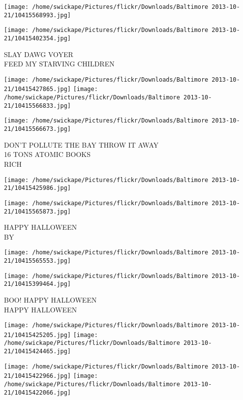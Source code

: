 \documentclass[10pt,letterpaper]{article}
\begin{document}
\texttt{[image: /home/swickape/Pictures/flickr/Downloads/Baltimore 2013-10-21/10415568993.jpg]}

\vspace{0.25in}
\texttt{[image: /home/swickape/Pictures/flickr/Downloads/Baltimore 2013-10-21/10415402354.jpg]}

SLAY DAWG VOYER\\
FEED MY STARVING CHILDREN
\pagebreak

\texttt{[image: /home/swickape/Pictures/flickr/Downloads/Baltimore 2013-10-21/10415427865.jpg]}
\texttt{[image: /home/swickape/Pictures/flickr/Downloads/Baltimore 2013-10-21/10415566833.jpg]}

\vspace{0.25in}
\texttt{[image: /home/swickape/Pictures/flickr/Downloads/Baltimore 2013-10-21/10415566673.jpg]}

DON'T POLLUTE THE BAY THROW IT AWAY\\
16 TONS ATOMIC BOOKS\\
RICH
\pagebreak

\texttt{[image: /home/swickape/Pictures/flickr/Downloads/Baltimore 2013-10-21/10415425986.jpg]}

\vspace{0.25in}
\texttt{[image: /home/swickape/Pictures/flickr/Downloads/Baltimore 2013-10-21/10415565873.jpg]}

HAPPY HALLOWEEN\\
BY
\pagebreak

\texttt{[image: /home/swickape/Pictures/flickr/Downloads/Baltimore 2013-10-21/10415565553.jpg]}

\vspace{0.25in}
\texttt{[image: /home/swickape/Pictures/flickr/Downloads/Baltimore 2013-10-21/10415399464.jpg]}

BOO! HAPPY HALLOWEEN\\
HAPPY HALLOWEEN
\pagebreak

\texttt{[image: /home/swickape/Pictures/flickr/Downloads/Baltimore 2013-10-21/10415425205.jpg]}
\texttt{[image: /home/swickape/Pictures/flickr/Downloads/Baltimore 2013-10-21/10415424465.jpg]}

\texttt{[image: /home/swickape/Pictures/flickr/Downloads/Baltimore 2013-10-21/10415422966.jpg]}
\texttt{[image: /home/swickape/Pictures/flickr/Downloads/Baltimore 2013-10-21/10415422066.jpg]}
\end{document}
